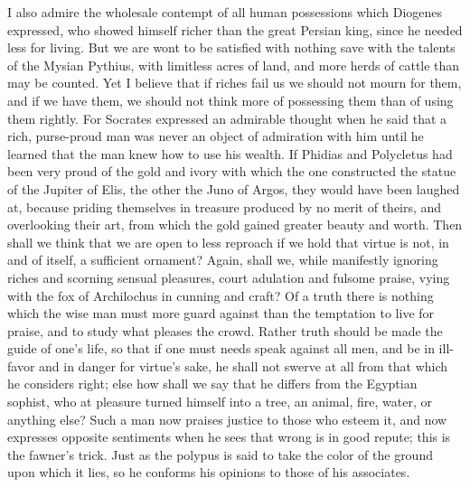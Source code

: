 \documentclass[a4paper]{article}
\begin{document}
I also admire the wholesale contempt of all human possessions which Diogenes expressed, who showed himself richer than the great Persian king, since he needed less for living. But we are wont to be satisfied with nothing save with the talents of the Mysian Pythius, with limitless acres of land, and more herds of cattle than may be counted. Yet I believe that if riches fail us we should not mourn for them, and if we have them, we should not think more of possessing them than of using them rightly. For Socrates expressed an admirable thought when he said that a rich, purse-proud man was never an object of admiration with him until he learned that the man knew how to use his wealth. If Phidias and Polycletus had been very proud of the gold and ivory with which the one constructed the statue of the Jupiter of Elis, the other the Juno of Argos, they would have been laughed at, because priding themselves in treasure produced by no merit of theirs, and overlooking their art, from which the gold gained greater beauty and worth. Then shall we think that we are open to less reproach if we hold that virtue is not, in and of itself, a sufficient ornament? Again, shall we, while manifestly ignoring riches and scorning sensual pleasures, court adulation and fulsome praise, vying with the fox of Archilochus in cunning and craft? Of a truth there is nothing which the wise man must more guard against than the temptation to live for praise, and to study what pleases the crowd. Rather truth should be made the guide of one's life, so that if one must needs speak against all men, and be in ill-favor and in danger for virtue's sake, he shall not swerve at all from that which he considers right; else how shall we say that he differs from the Egyptian sophist, who at pleasure turned himself into a tree, an animal, fire, water, or anything else? Such a man now praises justice to those who esteem it, and now expresses opposite sentiments when he sees that wrong is in good repute; this is the fawner's trick. Just as the polypus is said to take the color of the ground upon which it lies, so he conforms his opinions to those of his associates. 

\bigskip
\end{document}

